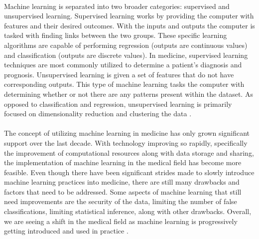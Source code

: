 \documentclass[10pt, oneside, twocolumn]{article}
\begin{document}
\paragraph{}
Machine learning is separated into two broader categories: supervised and unsupervised learning. Supervised learning works by providing the computer with features and their desired outcomes. With the inputs and outputs the computer is tasked with finding links between the two groups. These specific learning algorithms are capable of performing regression (outputs are continuous values) and classification (outputs are discrete values).  In medicine, supervised learning techniques are most commonly utilized to determine a patient’s diagnosis and prognosis. Unsupervised learning is given a set of features that do not have corresponding outputs. This type of machine learning tasks the computer with determining whether or not there are any patterns present within the dataset. As opposed to classification and regression, unsupervised learning is primarily focused on dimensionality reduction and clustering the data \cite{Handelman}. 
\paragraph{}
The concept of utilizing machine learning in medicine has only grown significant support over the last decade. With technology improving so rapidly, specifically the improvement of computational resources along with data storage and sharing, the implementation of machine learning in the medical field has become more feasible.  Even though there have been significant strides made to slowly introduce machine learning practices into medicine, there are still many drawbacks and factors that need to be addressed. Some aspects of machine learning that still need improvements are the security of the data, limiting the number of false classifications, limiting statistical inference, along with other drawbacks. Overall, we are seeing a shift in the medical field as machine learning is progressively getting introduced and used in practice \cite{Ascent}. 
\end{document}
